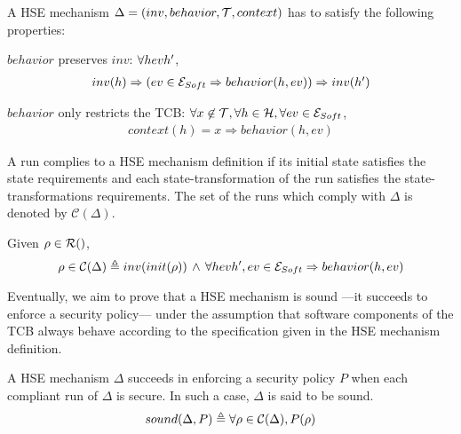 \begin{definition}
  \label{def:laws}
  A HSE mechanism $\Delta = (inv, behavior, \mathcal{T}, context)$ has to satisfy
  the following properties:
  \begin{compactenum}
  \item $behavior$ preserves $inv$: $\forall \transitionLTS{Ez}{h}{ev}{h'}$,
      \[ \begin{array}{l}
            inv(h) \Rightarrow (ev \in
            \mathcal{E}_{Soft} \Rightarrow behavior(h,ev)) \Rightarrow inv(h')
        \end{array}
      \]
    \item $behavior$ only restricts the TCB: $\forall x \not\in \mathcal{T}, \forall
      h \in \mathcal{H}, \forall ev \in \mathcal{E}_{Soft}$,
      \[
        \begin{array}{l}
          context(h) = x \Rightarrow behavior(h, ev)
        \end{array}
      \]
  \end{compactenum}
\end{definition}

A run complies to a HSE mechanism definition if its initial state satisfies the
state requirements and each state-transformation of the run satisfies the
state-transformations requirements. The set of the runs which comply with
$\Delta$ is denoted by $\mathcal{C}(\Delta)$.

\begin{definition}
  Given $\rho \in \pathesLTS{Ez}$, \[ \rho \in \mathcal{C}(\Delta) \triangleq
    inv(init(\rho))\,\wedge\,\forall \transitionLTS{Ez}{h}{ev}{h'}, ev \in
  \set{E}_{Soft} \Rightarrow behavior(h,ev) \]
\end{definition}

Eventually, we aim to prove that a HSE mechanism is sound \mbox{---it} succeeds
to enforce a security policy--- under the assumption that software components of
the TCB always behave according to the specification given in the HSE mechanism
definition.

\begin{definition}
  \label{def:sound}
A HSE mechanism $\Delta$ succeeds in enforcing a security policy $P$ when each
compliant run of $\Delta$ is secure. In such a case, $\Delta$ is said to be
sound.
\[ sound(\Delta, P) \triangleq \forall \rho \in \mathcal{C}(\Delta), P(\rho)
\]
\end{definition}

